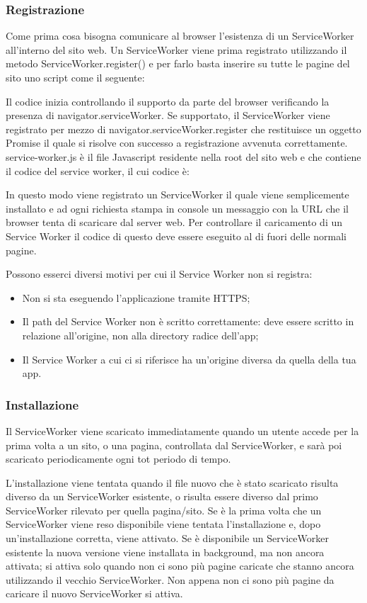 \documentclass[11pt ,a4paper , twoside , openright ]{article}
\begin{document}
\subsubsection{Registrazione}

Come prima cosa bisogna comunicare al browser l’esistenza di un ServiceWorker all’interno del sito web. Un ServiceWorker viene prima registrato utilizzando il metodo ServiceWorker.register() e per farlo basta inserire su tutte le pagine del sito uno script come il seguente:

Il codice inizia controllando il supporto da parte del browser verificando la presenza di navigator.serviceWorker. Se supportato, il ServiceWorker viene registrato per mezzo di navigator.serviceWorker.register che restituisce un oggetto Promise il quale si risolve con successo a registrazione avvenuta correttamente.
service-worker.js è il file Javascript residente nella root del sito web e che contiene il codice del service worker, il cui codice è:
\pagebreak

In questo modo viene registrato un ServiceWorker il quale viene semplicemente installato e ad ogni richiesta stampa in console un messaggio con la URL che il browser tenta di scaricare dal server web. Per controllare il caricamento di un Service Worker il codice di questo deve essere eseguito al di fuori delle normali pagine.

Possono esserci diversi motivi per cui il Service Worker non si registra:
\begin{itemize}
	\item Non si sta eseguendo l'applicazione tramite HTTPS;
	\item Il path del Service Worker non è scritto correttamente: deve essere scritto in relazione all'origine, non alla directory radice dell'app;
	\item Il Service Worker a cui ci si riferisce ha un'origine diversa da quella della tua app.
\end{itemize}

\subsubsection{Installazione}
Il ServiceWorker viene scaricato immediatamente quando un utente accede per la prima volta a un sito, o una pagina, controllata dal ServiceWorker, e sarà poi scaricato periodicamente ogni tot periodo di tempo.

L'installazione viene tentata quando il file nuovo che è stato scaricato risulta diverso da un ServiceWorker esistente, o risulta essere diverso dal primo ServiceWorker rilevato per quella pagina/sito. Se è la prima volta che un ServiceWorker viene reso disponibile viene tentata l'installazione e, dopo un'installazione corretta, viene attivato. Se è disponibile un ServiceWorker esistente la nuova versione viene installata in background, ma non ancora attivata; si attiva solo quando non ci sono più pagine caricate che stanno ancora utilizzando il vecchio ServiceWorker. Non appena non ci sono più pagine da caricare il nuovo ServiceWorker si attiva.
\end{document}
